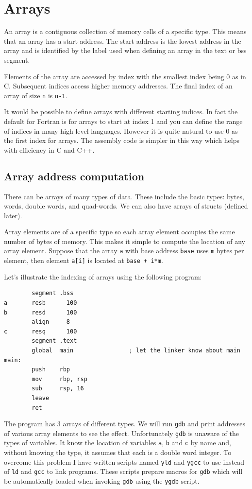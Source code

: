 \documentclass[11pt,b5paper]{book}
\begin{document}
\chapter{Arrays}

An array is a contiguous collection of memory cells of a specific type. 
This means that an array has a start address.
The start address is the lowest address in the array and is identified by the label used when defining an
array in the text or bss segment.

Elements of the array are accessed by index with the smallest index being 0 as in C. 
Subsequent indices access higher memory addresses.
The final index of an array of size {\tt n} is {\tt n-1}.

It would be possible to define arrays with different starting indices.
In fact the default for Fortran is for arrays to start at index 1 and you can define the range of indices in
many high level languages.
However it is quite natural to use 0 as the first index for arrays.
The assembly code is simpler in this way which helps with efficiency in C and C++.

\section{Array address computation}

There can be arrays of many types of data. 
These include the basic types: bytes, words, double words, and quad-words.
We can also have arrays of structs (defined later).

Array elements are of a specific type so each array element occupies the same number of bytes of memory.
This makes it simple to compute the location of any array element.
Suppose that the array {\tt a} with base address {\tt base} uses {\tt m} bytes per element,
then element {\tt a[i]} is located at {\tt base + i*m}.

Let's illustrate the indexing of arrays using the following program:
\begin{verbatim}
        segment .bss
a       resb      100
b       resd      100
        align     8
c       resq      100
        segment .text
        global  main                ; let the linker know about main
main:
        push    rbp
        mov     rbp, rsp
        sub     rsp, 16
        leave
        ret
\end{verbatim}

The program has 3 arrays of different types.
We will run {\tt gdb}  and print addresses of various array elements to see the effect.
Unfortunately {\tt gdb} is unaware of the types of variables.
It know the location of variables {\tt a}, {\tt b} and {\tt c} by
name and, without knowing the type, it assumes that each is a double word
integer.
To overcome this problem I have written scripts named {\tt yld} and {\tt ygcc}
to use instead of {\tt ld} and {\tt gcc} to link programs.
These scripts prepare macros for {\tt gdb} which will be automatically loaded
when invoking {\tt gdb} using the {\tt ygdb} script.
\end{document}

